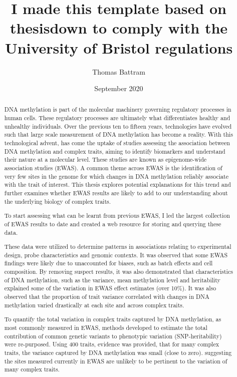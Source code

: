 \documentclass[11pt,oneside]{bristolthesis}
\title{I made this template based on thesisdown to comply with the University of Bristol regulations}
\author{Thomas Battram}
\date{September 2020}
\begin{document}
  \maketitle

\frontmatter %
\pagestyle{empty} %
  \begin{abstract}
    DNA methylation is part of the molecular machinery governing regulatory processes in human cells. These regulatory processes are ultimately what differentiates healthy and unhealthy individuals. Over the previous ten to fifteen years, technologies have evolved such that large scale measurement of DNA methylation has become a reality. With this technological advent, has come the uptake of studies assessing the association between DNA methylation and complex traits, aiming to identify biomarkers and understand their nature at a molecular level. These studies are known as epigenome-wide association studies (EWAS). A common theme across EWAS is the identification of very few sites in the genome for which changes in DNA methylation reliably associate with the trait of interest. This thesis explores potential explanations for this trend and further examines whether EWAS results are likely to add to our understanding about the underlying biology of complex traits.

    To start assessing what can be learnt from previous EWAS, I led the largest collection of EWAS results to date and created a web resource for storing and querying these data.

    These data were utilized to determine patterns in associations relating to experimental design, probe characteristics and genomic contexts. It was observed that some EWAS findings were likely due to unaccounted for biases, such as batch effects and cell composition. By removing suspect results, it was also demonstrated that characteristics of DNA methylation, such as the variance, mean methylation level and heritability explained some of the variation in EWAS effect estimates (over 10\%). It was also observed that the proportion of trait variance correlated with changes in DNA methylation varied drastically at each site and across complex traits.

    To quantify the total variation in complex traits captured by DNA methylation, as most commonly measured in EWAS, methods developed to estimate the total contribution of common genetic variants to phenotypic variation (SNP-heritability) were re-purposed. Using 400 traits, evidence was provided, that for many complex traits, the variance captured by DNA methylation was small (close to zero). suggesting the sites measured currently in EWAS are unlikely to be pertinent to the variation of many complex traits.


\end{abstract}
\end{document}
